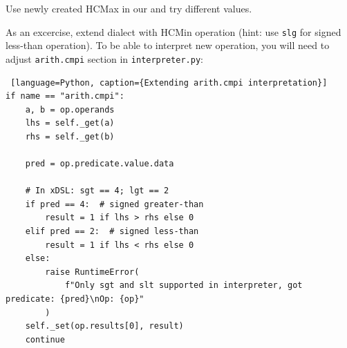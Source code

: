 \documentclass[../main.tex]{subfiles}
\begin{document}
Use newly created HCMax in our  and try different values.

As an excercise, extend dialect with HCMin operation (hint: use \texttt{slg} for signed less-than operation).
To be able to interpret new operation, you will need to adjust \texttt{arith.cmpi} section in \texttt{interpreter.py}:

\begin{lstlisting} [language=Python, caption={Extending arith.cmpi interpretation}]
if name == "arith.cmpi":
    a, b = op.operands
    lhs = self._get(a)
    rhs = self._get(b)

    pred = op.predicate.value.data

    # In xDSL: sgt == 4; lgt == 2
    if pred == 4:  # signed greater-than
        result = 1 if lhs > rhs else 0
    elif pred == 2:  # signed less-than
        result = 1 if lhs < rhs else 0
    else:
        raise RuntimeError(
            f"Only sgt and slt supported in interpreter, got predicate: {pred}\nOp: {op}"
        )
    self._set(op.results[0], result)
    continue
\end{lstlisting}
\end{document}
